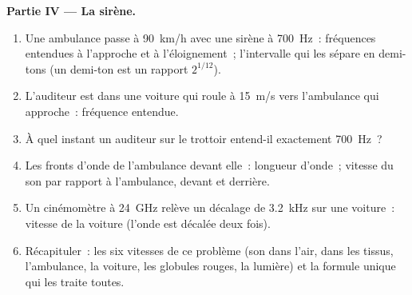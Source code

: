 \begin{problem}
\medskip
\noindent\textbf{Partie IV --- La sirène.}
\begin{enumerate}[resume]
  \item Une ambulance passe à \qty{90}{km/h} avec une sirène à \qty{700}{Hz}~:
        fréquences entendues à l'approche et à l'éloignement~; l'intervalle
        qui les sépare en demi-tons (un demi-ton est un rapport $2^{1/12}$).
  \item L'auditeur est dans une voiture qui roule à \qty{15}{m/s} vers
        l'ambulance qui approche~: fréquence entendue.
  \item À quel instant un auditeur sur le trottoir entend-il exactement
        \qty{700}{Hz}~?
  \item Les fronts d'onde de l'ambulance devant elle~: longueur d'onde~; vitesse du
        son par rapport à l'ambulance, devant et derrière.
  \item Un cinémomètre à \qty{24}{GHz} relève un décalage de \qty{3.2}{kHz} sur une voiture~:
        vitesse de la voiture (l'onde est décalée deux fois).
  \item Récapituler~: les six vitesses de ce problème (son dans l'air, dans
        les tissus, l'ambulance, la voiture, les globules rouges, la lumière) et la
        formule unique qui les traite toutes.
\end{enumerate}
\end{problem}
